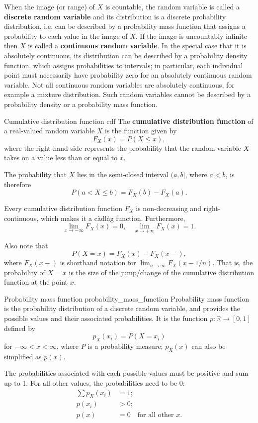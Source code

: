 When the image (or range) of $X$ is countable, the random variable is called a \textbf{discrete random variable} and its distribution is a discrete probability distribution, i.e. can be described by a probability mass function that assigns a probability to each value in the image of $X$. If the image is uncountably infinite then $X$ is called a \textbf{continuous random variable}. In the special case that it is absolutely continuous, its distribution can be described by a probability density function, which assigns probabilities to intervals; in particular, each individual point must necessarily have probability zero for an absolutely continuous random variable. Not all continuous random variables are absolutely continuous, for example a mixture distribution. Such random variables cannot be described by a probability density or a probability mass function.

\begin{definition}{Cumulative distribution function \cite{wikipedia_cdf}}{cdf}
	The \textbf{cumulative distribution function} of a real-valued random variable $X$ is the function given by
	$$ F_X(x) = P(X \leq x) , $$
	where the right-hand side represents the probability that the random variable $X$ takes on a value less than or equal to $x$.
	
	The probability that $X$ lies in the semi-closed interval $(a, b]$, where $a < b$, is therefore
	$$ P(a < X \leq b) = F_X(b) - F_X(a) . $$
\end{definition}

Every cumulative distribution function $F_X$ is non-decreasing and right-continuous, which makes it a càdlàg function. Furthermore,
$$ \lim_{x \to -\infty} F_X(x) = 0, \quad \lim_{x \to +\infty} F_X(x) = 1 . $$

Also note that
$$ P(X = x) = F_X(x) - F_X(x-) , $$
where $F_X(x-)$ is shorthand notation for $\lim_{n \to \infty} F_X(x - 1/n)$. That is, the probability of $X = x$ is the size of the jump/change of the cumulative distribution function at the point $x$.

\begin{definition}{Probability mass function \cite{wikipedia_probability_mass_function}}{probability_mass_function}
	Probability mass function is the probability distribution of a discrete random variable, and provides the possible values and their associated probabilities. It is the function $p : \mathbb{R} \to [0, 1]$ defined by
	$$ p_X(x_i) = P(X = x_i) $$
	for $-\infty < x < \infty$, where $P$ is a probability measure; $p_X(x)$ can also be simplified as $p(x)$.

	The probabilities associated with each possible values must be positive and sum up to 1. For all other values, the probabilities need to be 0:
	\begin{align*}
		\sum p_X(x_i) &= 1 ; \\
		p(x_i) &> 0 ; \\
		p(x) &= 0 \quad \text{for all other } x .
	\end{align*}
\end{definition}

